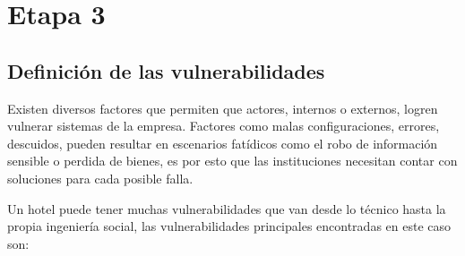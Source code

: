 \documentclass[10pt]{article}
\begin{document}
\begin{table}[H]
\caption{Problemáticas y prevenciones preliminares en otros activos}

\end{table}

\pagebreak

\section{Etapa 3}

\subsection{Definición de las vulnerabilidades}

Existen diversos factores que permiten que actores, internos o externos, logren vulnerar sistemas de la empresa. Factores como malas configuraciones, errores, descuidos, pueden resultar en escenarios fatídicos como el robo de información sensible o perdida de bienes, es por esto que las instituciones necesitan contar con soluciones para cada posible falla.


Un hotel puede tener muchas vulnerabilidades que van desde lo técnico hasta la propia ingeniería social, las vulnerabilidades principales encontradas en este caso son: 
\end{document}
